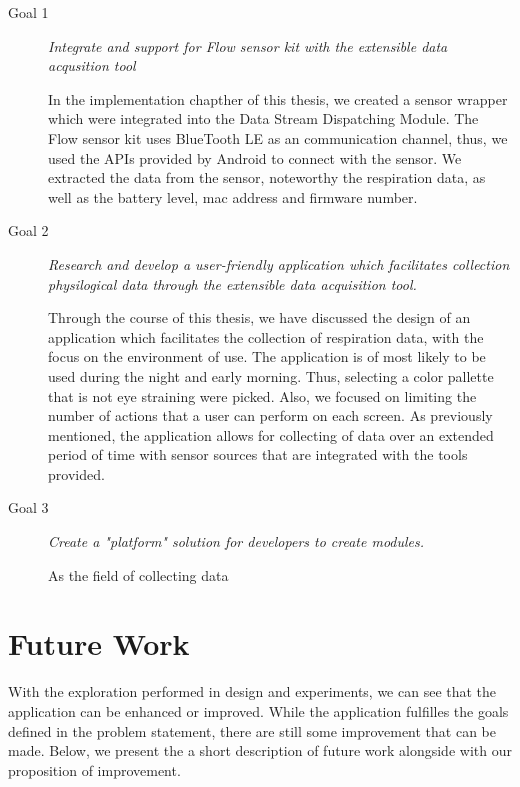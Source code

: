 \begin{description}
    \item[Goal 1] \textit{Integrate and support for Flow sensor kit with the extensible data acqusition tool}

    In the implementation chapther of this thesis, we created a sensor wrapper which were integrated into the Data Stream Dispatching Module. The Flow sensor kit uses BlueTooth LE as an communication channel, thus, we used the APIs provided by Android to connect with the sensor. We extracted the data from the sensor, noteworthy the respiration data, as well as the battery level, mac address and firmware number. 

    \item[Goal 2] \textit{Research and develop a user-friendly application which facilitates collection physilogical data through the extensible data acquisition tool.}


    Through the course of this thesis, we have discussed the design of an application which facilitates the collection of respiration data, with the focus on the environment of use. The application is of most likely to be used during the night and early morning. Thus, selecting a color pallette that is not eye straining were picked. Also, we focused on limiting the number of actions that a user can perform on each screen. As previously mentioned, the application allows for collecting of data over an extended period of time with sensor sources that are integrated with the tools provided. 


    \item[Goal 3] \textit{Create a "platform" solution for developers to create modules.}

    As the field of collecting data 
\end{description}

\section{Future Work}
With the exploration performed in design and experiments, we can see that the application can be enhanced or improved. While the application fulfilles the goals defined in the problem statement, there are still some improvement that can be made. Below, we present the a short description of future work alongside with our proposition of improvement. 

